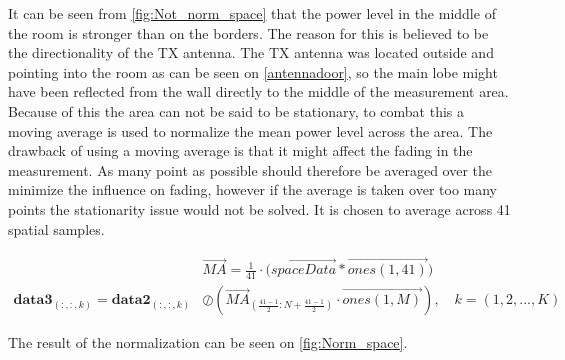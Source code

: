 It can be seen from \autoref{fig:Not_norm_space} that the power level in the middle of the room is stronger than on the borders. The reason for this is believed to be the directionality of the TX antenna. The TX antenna was located outside and pointing into the room as can be seen on \autoref{antennadoor}, so the main lobe might have been reflected from the wall directly to the middle of the measurement area. Because of this the area can not be said to be stationary, to combat this a moving average is used to normalize the mean power level across the area. The drawback of using a moving average is that it might affect the fading in the measurement. As many point as possible should therefore be averaged over the minimize the influence on fading, however if the average is taken over too many points the stationarity issue would not be solved. It is chosen to average across 41 spatial samples.

\begin{align}
&\overrightarrow{MA} = \frac{1}{41}\cdot \Big(\overrightarrow{spaceData}*\overrightarrow{ones(1,41)}\Big) \\
\textbf{data3}_{(:,:,k)} = \textbf{data2}_{(:,:,k)} &\oslash \left(\overrightarrow{MA}_{\left(\frac{41-1}{2}:N+\frac{41-1}{2}\right)}\cdot \overrightarrow{ones(1,M)}\right), \quad k = (1,2,...,K)
\end{align}
\begin{where}
\end{where}

The result of the normalization can be seen on \autoref{fig:Norm_space}.

